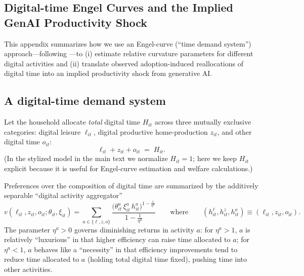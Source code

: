 \documentclass[12pt]{article}
\begin{document}

\subsection{Digital-time Engel Curves and the Implied GenAI Productivity Shock}
\label{app:engel_to_delta}

This appendix summarizes how we use an Engel-curve (``time demand system'') approach---following \citet{aguiar2021}---to (i) estimate relative curvature parameters for different digital activities and (ii) translate observed adoption-induced reallocations of digital time into an implied productivity shock from generative AI.

\subsection{A digital-time demand system}
\label{app:engel_setup}

Let the household allocate \emph{total} digital time $H_{it}$ across three mutually exclusive categories: digital leisure $\ell_{it}$, digital productive home-production $z_{it}$, and other digital time $o_{it}$:
\begin{equation}
\label{eq:app_digital_time_budget}
\ell_{it} + z_{it} + o_{it} \;=\; H_{it}.
\end{equation}
(In the stylized model in the main text we normalize $H_{it}=1$; here we keep $H_{it}$ explicit because it is useful for Engel-curve estimation and welfare calculations.)

Preferences over the composition of digital time are summarized by the additively separable ``digital activity aggregator''
\begin{equation}
\label{eq:app_activity_aggregator}
v(\ell_{it},z_{it},o_{it};\theta_{it},\xi_{it})
=
\sum_{a\in\{\ell,z,o\}}
\frac{\big(\theta_{it}^{a}\,\xi_{it}^{a}\,h_{it}^{a}\big)^{1-\frac{1}{\eta^{a}}}}{1-\frac{1}{\eta^{a}}}
\qquad\text{where}\qquad
(h_{it}^{\ell},h_{it}^{z},h_{it}^{o})\equiv(\ell_{it},z_{it},o_{it}).
\end{equation}
The parameter $\eta^{a}>0$ governs diminishing returns in activity $a$: for $\eta^{a}>1$, $a$ is relatively ``luxurious'' in that higher efficiency can raise time allocated to $a$; for $\eta^{a}<1$, $a$ behaves like a ``necessity'' in that efficiency improvements tend to reduce time allocated to $a$ (holding total digital time fixed), pushing time into other activities.
\end{document}
